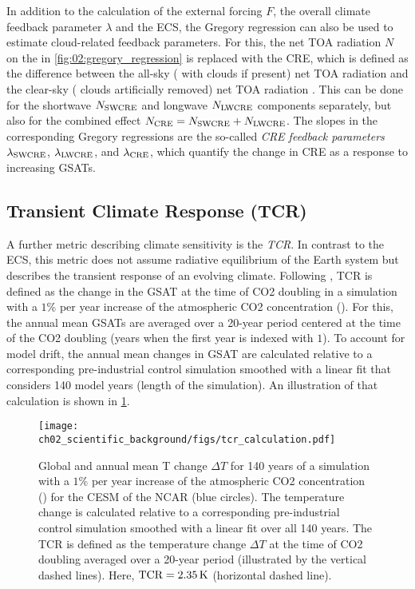 In addition to the calculation of the external forcing $F$, the overall climate
feedback parameter $\lambda$ and the \ac{ECS}, the Gregory regression can also
be used to estimate cloud-related feedback parameters. For this, the net
\ac{TOA} radiation $N$ on the \yaxis{} in \cref{fig:02:gregory_regression} is
replaced with the \ac{CRE}, which is defined as the difference between the
all-sky (\ie{} with clouds if present) net \ac{TOA} radiation and the clear-sky
(\ie{} clouds artificially removed) net \ac{TOA} radiation
\autocite{Andrews2012}. This can be done for the shortwave $N_\mathtxt{SWCRE}$
and longwave $N_\mathtxt{LWCRE}$ components separately, but also for the
combined effect $N_\mathtxt{CRE} = N_\mathtxt{SWCRE} + N_\mathtxt{LWCRE}$. The
slopes in the corresponding Gregory regressions are the so-called
\emph{\ac{CRE} feedback parameters} $\lambda_\mathtxt{SWCRE}$,
$\lambda_\mathtxt{LWCRE}$, and $\lambda_\mathtxt{CRE}$, which quantify the
change in \ac{CRE} as a response to increasing \acp{GSAT}.


\subsection{Transient Climate Response (\acs{TCR})}
\label{subsec:02:tcr}

A further metric describing climate sensitivity is the \emph{\ac{TCR}}. In
contrast to the \ac{ECS}, this metric does not assume radiative equilibrium of
the Earth system but describes the transient response of an evolving climate.
Following \textcite{Bindoff2013}, \ac{TCR} is defined as the change in the
\ac{GSAT} at the time of \ac{CO2} doubling in a simulation with a $1 \unit{\%}$
per year increase of the atmospheric \ac{CO2} concentration (\onepctcotwo{}).
For this, the annual mean \acp{GSAT} are averaged over a 20-year period
centered at the time of the \ac{CO2} doubling (years  when the
first year is indexed with $1$). To account for model drift, the annual mean
changes in \ac{GSAT} are calculated relative to a corresponding pre-industrial
control simulation smoothed with a linear fit that considers 140 model years
(length of the \onepctcotwo{} simulation). An illustration of that calculation
is shown in \cref{fig:02:tcr}.

\begin{figure}[t]
  \centering
  \texttt{[image: 
    ch02\_scientific\_background/figs/tcr\_calculation.pdf]}
  \caption[
    Illustration of the definition of the \acf{TCR}.
  ]{
    Global and annual mean \acl{T} change $\Delta T$ for 140 years of a
    simulation with a $1 \unit{\%}$ per year increase of the atmospheric
    \acs{CO2} concentration (\onepctcotwo{}) for the \acf{CESM} of the
    \acf{NCAR} (blue circles). The temperature change is calculated relative to
    a corresponding pre-industrial control simulation smoothed with a linear
    fit over all 140 years. The \acf{TCR} is defined as the temperature change
    $\Delta T$ at the time of \acs{CO2} doubling averaged over a 20-year period
    (illustrated by the vertical dashed lines). Here, $\mathtxt{TCR} = 2.35
    \unit{K}$ (horizontal dashed line).
  }
  \label{fig:02:tcr}
\end{figure}


